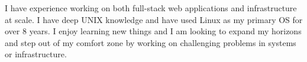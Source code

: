 

\begin{cvparagraph}

  I have experience working on both full-stack web applications and infrastructure at scale. I have deep UNIX knowledge and have used Linux as my primary OS for over 8 years. I enjoy learning new things and I am looking to expand my horizons and step out of my comfort zone by working on challenging problems in systems or infrastructure.
\end{cvparagraph}
